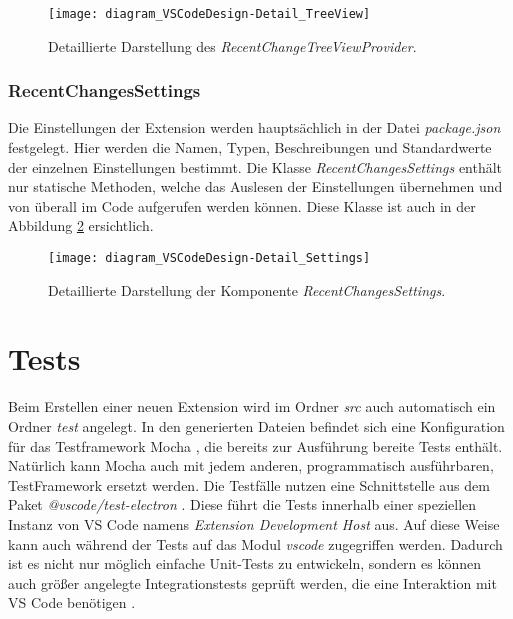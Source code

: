 \begin{figure}
    \centering
    \texttt{[image: diagram\_VSCodeDesign-Detail\_TreeView]}
    \caption{Detaillierte Darstellung des \emph{RecentChangeTreeViewProvider}.}
    \label{fig:diagram_VSCodeDesign-Detail_TreeView}
\end{figure}   

\subsubsection{RecentChangesSettings}

Die Einstellungen der Extension werden hauptsächlich in der Datei
\emph{package.json} festgelegt. Hier werden die Namen, Typen, 
Beschreibungen und Standardwerte der einzelnen Einstellungen bestimmt.
Die Klasse \emph{RecentChangesSettings} enthält nur statische 
Methoden, welche das Auslesen der Einstellungen übernehmen und
von überall im Code aufgerufen werden können.
Diese Klasse ist auch in der Abbildung \ref{fig:diagram_VSCodeDesign-Detail_Settings} 
ersichtlich.

\begin{figure}
    \centering
    \texttt{[image: diagram\_VSCodeDesign-Detail\_Settings]}
    \caption{Detaillierte Darstellung der Komponente \emph{RecentChangesSettings}.}
    \label{fig:diagram_VSCodeDesign-Detail_Settings}
\end{figure} 

\section{Tests}
\label{sec:EntwicklungVsCode_Tests}

Beim Erstellen einer neuen Extension wird im Ordner \emph{src} 
auch automatisch ein Ordner \emph{test} angelegt. 
In den generierten Dateien befindet sich 
eine Konfiguration für das Test\-framework Mocha \cite{MochaJSWebsite}, 
die bereits zur Ausführung bereite Tests enthält. Natürlich
kann Mocha auch mit jedem anderen, programmatisch ausführbaren,
TestFramework ersetzt werden. Die Testfälle nutzen eine Schnittstelle
aus dem Paket \emph{@vscode/test-electron} \cite{VSCodeTestElectronGithub}. 
Diese führt die Tests
innerhalb einer speziellen Instanz von VS Code namens 
\emph{Extension Development Host} aus. Auf diese Weise kann auch
während der Tests auf das Modul \emph{vscode} zugegriffen werden.
Dadurch ist es nicht nur möglich einfache Unit-Tests zu entwickeln, 
sondern es können auch größer angelegte Integrationstests
geprüft werden, die eine Interaktion mit VS Code benötigen 
\cite{VSCodeExtensionAPITestingExtensions}.

